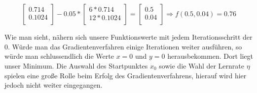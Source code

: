 \begin{align*}
    \\\\
    \begin{bmatrix}
      0.714\\
      0.1024\\
    \end{bmatrix} - 0.05 * \begin{bmatrix}
      6 * 0.714\\
      12 * 0.1024\\
    \end{bmatrix} = \begin{bmatrix}
      0.5\\
      0.04\\
    \end{bmatrix} \Rightarrow f(0.5, 0.04) = 0.76
    \\\\
  \end{align*}
  Wie man sieht, nähern sich unsere Funktionswerte mit jedem Iterationsschritt
  der 0. Würde man das Gradientenverfahren einige Iterationen weiter ausführen, so 
  würde man schlussendlich die Werte $x = 0$ und $y = 0$ herausbekommen. Dort liegt unser Minimum.
  \bigbreak\noindent
  Die Auswahl des Startpunktes $x_{0}$ sowie die Wahl der Lernrate $\eta$ spielen eine große Rolle beim Erfolg des
  Gradientenverfahrens, hierauf wird hier jedoch nicht weiter eingegangen.
  \cite{CA18}
\iffalse
